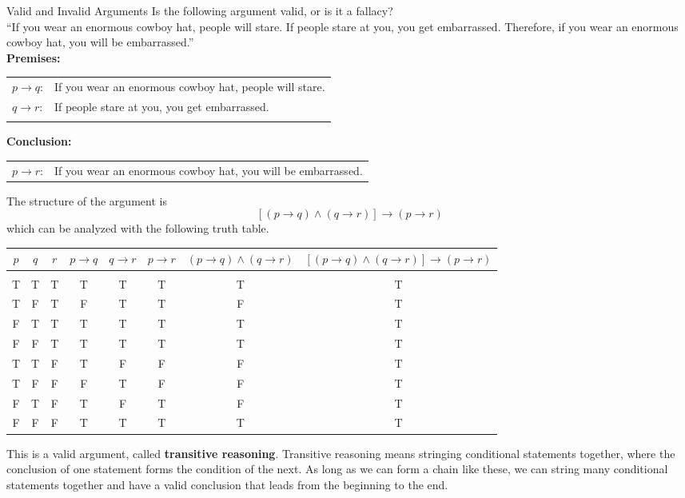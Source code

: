 \begin{example}[https://www.youtube.com/watch?v=0M57bPxQOKg]{Valid and Invalid Arguments}
Is the following argument valid, or is it a fallacy?\\

``If you wear an enormous cowboy hat, people will stare.  If people stare at you, you get embarrassed.  Therefore, if you wear an enormous cowboy hat, you will be embarrassed.''\\

\textbf{Premises:}\\
\begin{tabular}{l l}
$p \to q$: & If you wear an enormous cowboy hat, people will stare.\\
$q \to r$: & If people stare at you, you get embarrassed.\\
& \\
\end{tabular}

\textbf{Conclusion:}\\
\begin{tabular}{l l}
$p \to r$: & If you wear an enormous cowboy hat, you will be embarrassed.
\end{tabular}

The structure of the argument is \[[(p \to q) \wedge (q \to r)] \to (p \to r)\]
which can be analyzed with the following truth table.
\begin{center}
{\small
\begin{tabular}{|c c c c c c c c|}
\hline
$p$ & $q$ & $r$ & $p \to q$ & $q \to r$ & $p \to r$ & $(p \to q) \wedge (q \to r)$ & $[(p \to q) \wedge (q \to r)] \to (p \to r)$\\
\hline
& & & & & & & \\
T & T & T & T & T & T & T & T\\
T & F & T & F & T & T & F & T\\
F & T & T & T & T & T & T & T\\
F & F & T & T & T & T & T & T\\
T & T & F & T & F & F & F & T\\
T & F & F & F & T & F & F & T\\
F & T & F & T & F & T & F & T\\
F & F & F & T & T & T & T & T\\
\hline
\end{tabular}}
\end{center}

This is a valid argument, called \textbf{transitive reasoning}.  Transitive reasoning means stringing conditional statements together, where the conclusion of one statement forms the condition of the next.  As long as we can form a chain like these, we can string many conditional statements together and have a valid conclusion that leads from the beginning to the end.
\end{example}
\vfill
\pagebreak

